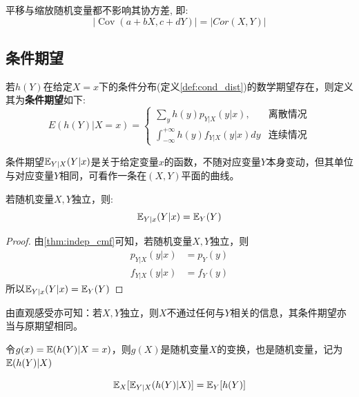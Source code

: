 \begin{theorem}
    平移与缩放随机变量都不影响其协方差, 即:
    \[ \left| \operatorname{Cov}(a+ b X,c +d Y) \right| = \left| Cor(X,Y) \right|  \]
\end{theorem}

\subsection{条件期望}

\begin{definition}
    若$h(Y)$在给定$X=x$下的条件分布(定义\ref{def:cond_dist})的数学期望存在，则定义其为\textbf{条件期望}如下:
    \[ E(h(Y)|X=x) =\begin{cases}
            \sum_{y} h(y) p_{Y|X}(y|x),                    & \text{离散情况} \\
            \int_{-\infty}^{+\infty} h(y) f_{Y|X}(y|x) d y & \text{连续情况}
        \end{cases}\]
\end{definition}

\begin{remark}
    条件期望$\mathbb{E}_{Y|X}(Y|x)$是关于给定变量$x$的函数，不随对应变量$Y$本身变动，但其单位与对应变量$Y$相同，可看作一条在$(X,Y)$平面的曲线。
\end{remark}

\begin{theorem}
    若随机变量$X,Y$独立，则:
    \[ \mathbb{E}_{Y|x}(Y|x)=\mathbb{E}_{Y}(Y) \]
\end{theorem}

\begin{proof}
    由\ref{thm:indep_cmf}可知，若随机变量$X,Y$独立，则
    \begin{align*}
        p_{Y|X}(y|x)&=p_{Y}(y) \\
        f_{Y|X}(y|x)&=f_{Y}(y)
    \end{align*}
    所以$\mathbb{E}_{Y|x}(Y|x)=\mathbb{E}_{Y}(Y)$
\end{proof}

由直观感受亦可知：若$X,Y$独立，则$X$不通过任何与$Y$相关的信息，其条件期望亦当与原期望相同。

\begin{note}
    令$g(x)=\mathbb{E}(h(Y)|X=x)$，则$g(X)$是随机变量$X$的变换，也是随机变量，记为$\mathbb{E}(h(Y)|X)$
\end{note}

\begin{theorem}[重期望公式]
    \[ \mathbb{E}_X[\mathbb{E}_{Y|X}(h(Y)|X)] = \mathbb{E}_{Y}[h(Y)] \]
\end{theorem}

